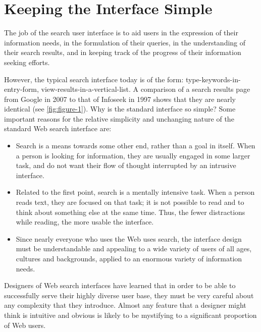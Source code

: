 \documentclass[sigconf,nonacm,screen,pbalance]{acmart}
\begin{document}
\section{Keeping the Interface Simple}

The job of the search user interface is to aid users in the expression of their information needs, in the
formulation of their queries, in the understanding of their search results, and in keeping track of the
progress of their information seeking efforts.

However, the typical search interface today is of the form: type-keywords-in-entry-form,
view-results-in-a-vertical-list. A comparison of a search results page from Google in 2007 to that of
Infoseek in 1997 shows that they are nearly identical (see \autoref{fig:figure-1}). Why is the
standard interface so simple? Some important reasons for the relative simplicity and unchanging nature of
the standard Web search interface are:

\begin{itemize}[leftmargin=1.5em,labelwidth=*]
    \item Search is a means towards some other end, rather than a goal in itself. When a person is looking for
    information, they are usually engaged in some larger task, and do not want their flow of thought
    interrupted by an intrusive interface.

\item Related to the first point, search is a mentally intensive task. When a person reads text, they are
    focused on that task; it is not possible to read and to think about something else at the same time.
    Thus, the fewer distractions while reading, the more usable the interface.

\item Since nearly everyone who uses the Web uses search, the interface design must be understandable and
    appealing to a wide variety of users of all ages, cultures and backgrounds, applied to an enormous
    variety of information needs. 
\end{itemize}

Designers of Web search interfaces have learned that in order to be able to successfully serve their
highly diverse user base, they must be very careful about any complexity that they introduce. Almost any
feature that a designer might think is intuitive and obvious is likely to be mystifying to a significant
proportion of Web users.
\end{document}

